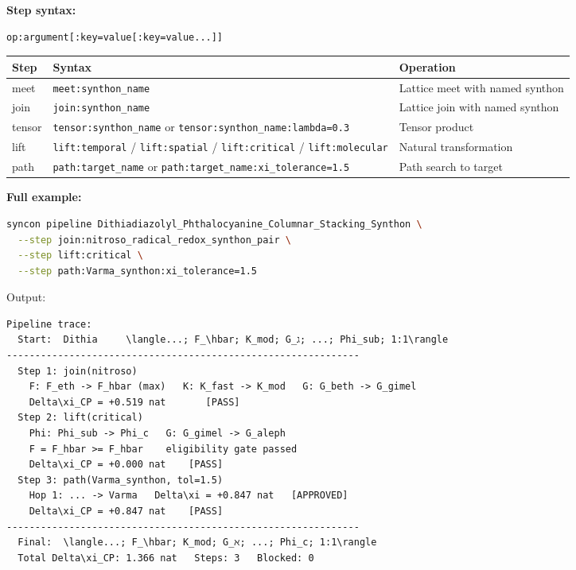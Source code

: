 \documentclass[12pt,a4paper]{article}
\begin{document}
\textbf{Step syntax:}

\begin{lstlisting}
op:argument[:key=value[:key=value...]]
\end{lstlisting}

\begin{table}[htbp]
\centering
\small
{}
\begin{tabularx}{\textwidth}{>{\centering\arraybackslash}X >{\centering\arraybackslash}X >{\centering\arraybackslash}X}
\toprule
\rowcolor{gray!25}\textbf{Step} & \textbf{Syntax} & \textbf{Operation} \\
\midrule
\rowcolors{1}{white}{gray!10}
meet & \texttt{meet:synthon\_name} & Lattice meet with named synthon \\
join & \texttt{join:synthon\_name} & Lattice join with named synthon \\
tensor & \texttt{tensor:synthon\_name} or \texttt{tensor:synthon\_name:lambda=0.3} & Tensor product \\
lift & \texttt{lift:temporal} / \texttt{lift:spatial} / \texttt{lift:critical} / \texttt{lift:molecular} & Natural transformation \\
path & \texttt{path:target\_name} or \texttt{path:target\_name:xi\_tolerance=1.5} & Path search to target \\
\bottomrule
\end{tabularx}
\end{table}

\textbf{Full example:}

\begin{lstlisting}[language=bash]
syncon pipeline Dithiadiazolyl_Phthalocyanine_Columnar_Stacking_Synthon \
  --step join:nitroso_radical_redox_synthon_pair \
  --step lift:critical \
  --step path:Varma_synthon:xi_tolerance=1.5
\end{lstlisting}

Output:

\begin{lstlisting}
Pipeline trace:
  Start:  Dithia     \langle...; F_\hbar; K_mod; G_ג; ...; Phi_sub; 1:1\rangle
--------------------------------------------------------------
  Step 1: join(nitroso)
    F: F_eth -> F_hbar (max)   K: K_fast -> K_mod   G: G_beth -> G_gimel
    Delta\xi_CP = +0.519 nat       [PASS]
  Step 2: lift(critical)
    Phi: Phi_sub -> Phi_c   G: G_gimel -> G_aleph
    F = F_hbar >= F_hbar    eligibility gate passed
    Delta\xi_CP = +0.000 nat    [PASS]
  Step 3: path(Varma_synthon, tol=1.5)
    Hop 1: ... -> Varma   Delta\xi = +0.847 nat   [APPROVED]
    Delta\xi_CP = +0.847 nat    [PASS]
--------------------------------------------------------------
  Final:  \langle...; F_\hbar; K_mod; G_ℵ; ...; Phi_c; 1:1\rangle
  Total Delta\xi_CP: 1.366 nat   Steps: 3   Blocked: 0
\end{lstlisting}
\end{document}
